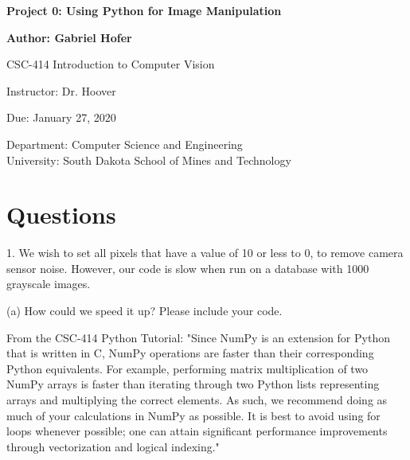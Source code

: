 \documentclass[12pt]{article}
\begin{document}
\begin{titlepage}
   \begin{center}
       \vspace*{1cm}
       \large
       \textbf{Project 0: Using Python for Image Manipulation}
       \normalsize

       \vspace{0.5cm}

       \textbf{Author: Gabriel Hofer}

       \vspace{0.5cm}

       CSC-414 Introduction to Computer Vision

       \vspace{0.5cm}

       Instructor: Dr. Hoover

       \vspace{0.5cm}

       Due: January 27, 2020

       \vfill

       Department: Computer Science and Engineering\\
       University: South Dakota School of Mines and Technology\\
   \end{center}
\end{titlepage}


\newpage
\section{Questions}
\small
1. We wish to set all pixels that have a value of 10 or less to 0, to remove camera
sensor noise. However, our code is slow when run on a database with 1000
grayscale images.

(a) How could we speed it up? Please include your code.

From the CSC-414 Python Tutorial: 
"Since NumPy is an extension for Python that is written in C, NumPy operations are faster than
their corresponding Python equivalents. For example, performing matrix multiplication of two
NumPy arrays is faster than iterating through two Python lists representing arrays and multiplying
the correct elements. As such, we recommend doing as much of your calculations in NumPy
as possible. It is best to avoid using for loops whenever possible; one can attain significant
performance improvements through vectorization and logical indexing."
\end{document}
